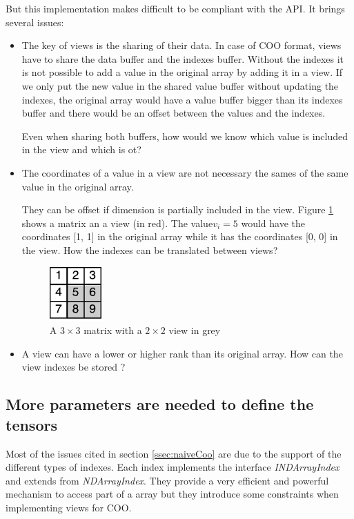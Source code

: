 
But this implementation makes difficult to be compliant with the API. It brings several issues:
\begin{itemize}
	\item The key of views is the sharing of their data. In case of COO format, views have to share the data buffer and the indexes buffer. Without the indexes it is not possible to add a value in the original array by adding it in a view. If we only put the new value in the shared value buffer without updating the indexes, the original array would have a value buffer bigger than its indexes buffer and there would be an offset between the values and the indexes. 
	
	Even when sharing both buffers, how would we know which value is included in the view and which is ot? 	
	
	\item The coordinates of a value in a view are not necessary the sames of the same value in the original array. 
		
	They can be offset if dimension is partially included in the view. Figure \ref{fig:viewOffset} shows a matrix an a view (in red). The value$ v_{i}=5$ would have the coordinates [1, 1] in the original array while it has the coordinates [0, 0] in the view. How the indexes can be translated between views?
	\begin{figure}[!h]
		\centering
		\includegraphics[width=0.8in]{images/viewIndexOffset.pdf}
		\caption{A $3\times 3$ matrix with a $2\times 2$ view in grey}
		\label{fig:viewOffset}
	\end{figure}

	\item A view can have a lower or higher rank than its original array. How can the view indexes be stored ?
\end{itemize}

\subsection{More parameters are needed to define the tensors}

Most of the issues cited in section \ref{ssec:naiveCoo} are due to the support of the different types of indexes. Each index implements the interface \textit{INDArrayIndex} and extends from \textit{NDArrayIndex}. They provide a very efficient and powerful mechanism to access part of a array but they introduce some constraints when implementing views for COO.

